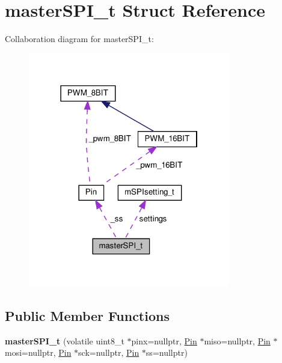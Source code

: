 \hypertarget{structmasterSPI__t}{}\section{master\+S\+P\+I\+\_\+t Struct Reference}
\label{structmasterSPI__t}


Collaboration diagram for master\+S\+P\+I\+\_\+t\+:\nopagebreak
\begin{figure}[H]
\begin{center}
\leavevmode
\includegraphics[width=250pt]{structmasterSPI__t__coll__graph}
\end{center}
\end{figure}
\subsection*{Public Member Functions}
\begin{DoxyCompactItemize}
\item 
\mbox{\label{structmasterSPI__t_a3344d8520f2e855f5ecf53bfe03415fe}} 
{\bfseries master\+S\+P\+I\+\_\+t} (volatile uint8\+\_\+t $\ast$pinx=nullptr, \hyperlink{classPin}{Pin} $\ast$miso=nullptr, \hyperlink{classPin}{Pin} $\ast$mosi=nullptr, \hyperlink{classPin}{Pin} $\ast$sck=nullptr, \hyperlink{classPin}{Pin} $\ast$ss=nullptr)
\end{DoxyCompactItemize}
